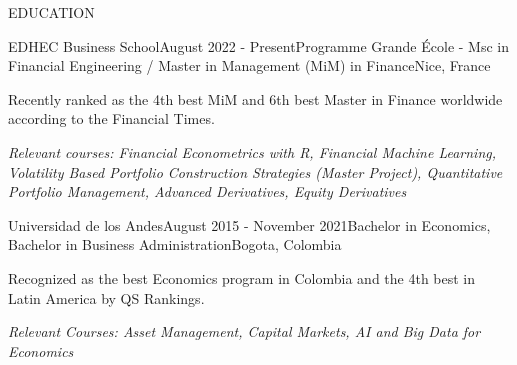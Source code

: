\documentclass{resume} %
\begin{document}
%
%

\begin{rSection}{EDUCATION}

\begin{rSubsection}{EDHEC Business School}{August 2022 - Present}{Programme Grande École - Msc in Financial Engineering / Master in Management (MiM) in Finance}{Nice, France}
    \item Recently ranked as the 4th best MiM and 6th best Master in Finance worldwide according to the Financial Times.
    \item \textit{Relevant courses: Financial Econometrics with R, Financial Machine Learning, Volatility Based Portfolio Construction Strategies (Master Project), Quantitative Portfolio Management, Advanced Derivatives, Equity Derivatives}
\end{rSubsection}

\begin{rSubsection}{Universidad de los Andes}{August 2015 - November 2021}{Bachelor in Economics,  Bachelor in Business Administration}{Bogota, Colombia}
    \item Recognized as the best Economics program in Colombia and the 4th best in Latin America by QS Rankings.
    \item \textit{Relevant Courses: Asset Management, Capital Markets, AI and Big Data for Economics}
\end{rSubsection}

\end{rSection}


%
%
\end{document}

